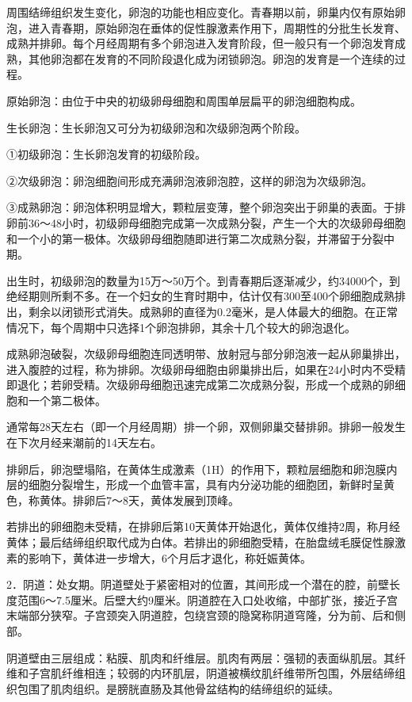 \documentclass[12pt,UTF8]{ctexbook}
\begin{document}
周围结缔组织发生变化，卵泡的功能也相应变化。青春期以前，卵巢内仅有原始卵泡，进入青春期，原始卵泡在垂体的促性腺激素作用下，周期性的分批生长发育、成熟并排卵。每个月经周期有多个卵泡进入发育阶段，但一般只有一个卵泡发育成熟，其他卵泡都在发育的不同阶段退化成为闭锁卵泡。卵泡的发育是一个连续的过程。

原始卵泡：由位于中央的初级卵母细胞和周围单层扁平的卵泡细胞构成。

生长卵泡：生长卵泡又可分为初级卵泡和次级卵泡两个阶段。

①初级卵泡：生长卵泡发育的初级阶段。

②次级卵泡：卵泡细胞间形成充满卵泡液卵泡腔，这样的卵泡为次级卵泡。

③成熟卵泡：卵泡体积明显增大，颗粒层变薄，整个卵泡突出于卵巢的表面。于排卵前36～48小时，初级卵母细胞完成第一次成熟分裂，产生一个大的次级卵母细胞和一个小的第一极体。次级卵母细胞随即进行第二次成熟分裂，并滞留于分裂中期。

出生时，初级卵泡的数量为15万～50万个。到青春期后逐渐减少，约34000个，到绝经期则所剩不多。在一个妇女的生育时期中，估计仅有300至400个卵细胞成熟排出，剩余以闭锁形式消失。成熟卵的直径为0.2毫米，是人体最大的细胞。在正常情况下，每个周期中只选择1个卵泡排卵，其余十几个较大的卵泡退化。

成熟卵泡破裂，次级卵母细胞连同透明带、放射冠与部分卵泡液一起从卵巢排出，进入腹腔的过程，称为排卵。次级卵母细胞由卵巢排出后，如果在24小时内不受精即退化；若卵受精。次级卵母细胞迅速完成第二次成熟分裂，形成一个成熟的卵细胞和一个第二极体。

通常每28天左右（即一个月经周期）排一个卵，双侧卵巢交替排卵。排卵一般发生在下次月经来潮前的14天左右。

排卵后，卵泡壁塌陷，在黄体生成激素（1H）的作用下，颗粒层细胞和卵泡膜内层的细胞分裂增生，形成一个血管丰富，具有内分泌功能的细胞团，新鲜时呈黄色，称黄体。排卵后7～8天，黄体发展到顶峰。

若排出的卵细胞未受精，在排卵后第10天黄体开始退化，黄体仅维持2周，称月经黄体；最后结缔组织取代成为白体。若排出的卵细胞受精，在胎盘绒毛膜促性腺激素的影响下，黄体进一步增大，6个月后才退化，称妊娠黄体。

2．阴道：处女期。阴道壁处于紧密相对的位置，其间形成一个潜在的腔，前壁长度范围6～7.5厘米。后壁大约9厘米。阴道腔在入口处收缩，中部扩张，接近子宫末端部分狭窄。子宫颈突入阴道腔，包绕宫颈的隐窝称阴道穹隆，分为前、后和侧部。

阴道壁由三层组成：粘膜、肌肉和纤维层。肌肉有两层：强韧的表面纵肌层。其纤维和子宫肌纤维相连；较弱的内环肌层，阴道被横纹肌纤维带所包围，外层结缔组织包围了肌肉组织。是膀胱直肠及其他骨盆结构的结缔组织的延续。
\end{document}
